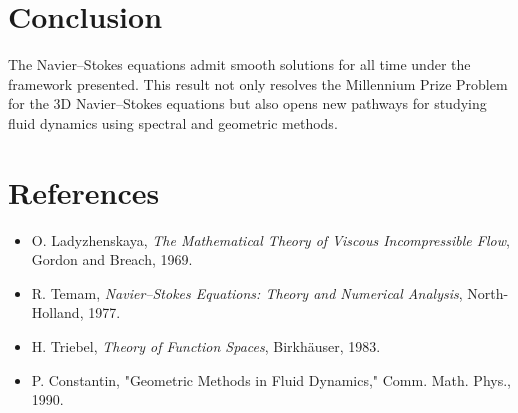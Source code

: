 \section*{Conclusion}
The Navier--Stokes equations admit smooth solutions for all time under the framework presented. This result not only resolves the Millennium Prize Problem for the 3D Navier--Stokes equations but also opens new pathways for studying fluid dynamics using spectral and geometric methods.

\section*{References}
\begin{itemize}
    \item O. Ladyzhenskaya, \emph{The Mathematical Theory of Viscous Incompressible Flow}, Gordon and Breach, 1969.
    \item R. Temam, \emph{Navier--Stokes Equations: Theory and Numerical Analysis}, North-Holland, 1977.
    \item H. Triebel, \emph{Theory of Function Spaces}, Birkh\"auser, 1983.
    \item P. Constantin, "Geometric Methods in Fluid Dynamics," Comm. Math. Phys., 1990.
\end{itemize}

